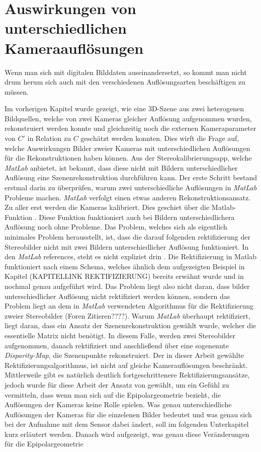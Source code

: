\chapter{Auswirkungen von unterschiedlichen Kameraauflösungen}

Wenn man sich mit digitalen Bilddaten auseinandersetzt, so kommt man nicht drum herum sich auch mit den  verschiedenen Auflösungsarten beschäftigen zu müssen.

Im vorherigen Kapitel wurde gezeigt, wie eine 3D-Szene aus zwei heterogenen Bildquellen, welche von zwei Kameras gleicher Auflösung aufgenommen wurden, rekonstruiert werden konnte und gleichzeitig noch die externen Kameraparameter von $C'$ in Relation zu $C$ geschätzt werden konnten. Dies wirft die Frage auf, welche Auswirkungen Bilder zweier Kameras mit unterschiedlichen Auflösungen für die Rekonstruktionen haben können. Aus der Stereokalibrierungsapp, welche \textit{MatLab} anbietet, ist bekannt, dass diese nicht mit Bildern unterschiedlicher Auflösung eine Szenenrekonstruktion durchführen kann. Der erste Schritt bestand erstmal darin zu überprüfen, warum zwei unterschiedliche Auflösungen in \textit{MatLab} Probleme machen. \textit{MatLab} verfolgt einen etwas anderen Rekonstruktionsansatz. Zu aller erst werden die Kameras kalibriert. Dies geschiet über die Matlab-Funktion \cite{MatlabCamParam}. Diese Funktion funktioniert auch bei Bildern unterschiedlichera Auflösung noch ohne Probleme. Das Problem, welches sich als eigentlich minimales Problem herausstellt, ist, dass die darauf folgenden rektifizierung der Stereobilder nicht mit zwei Bildern unterschiedlicher Auflösung funktioniert. In den \textit{MatLab} references, steht es nicht expliziet drin \cite{MatlabRec}. Die Rektifizierung in Matlab funktioniert nach einem Schema, welches ähnlich dem aufgezeigten Beispiel in Kapitel (KAPITELLINK REKTIFIZIERUNG) bereits erwähnt wurde und in \cite{Fusiello,FusielloSite} nochmal genau aufgeführt wird. Das Problem liegt also nicht daran, dass bilder unterschiedlicher Auflösung nicht rektifiziert werden können, sondern das Problem liegt an dem in \textit{MatLab} verwendeten Algorithmus für die Rektifizierung zweier Stereobilder (Foren Zitieren????). Warum \textit{MatLab} überhaupt rektifiziert, liegt daran, dass ein Ansatz der Szenenrekonstruktion gewählt wurde, welcher die essentielle Matrix nicht benötigt. In diesem Falle, werden zwei Stereobilder aufgenommen, danach rektifiziert und anschließend über eine sogenennte \textit{Disparity-Map}, die Szenenpunkte rekonstruiert\cite{MatlabDisp,MatlabStereoApp,Fusiello,Javier}. Der in dieser Arbeit gewählte Rektifizierungsalgorithmus, ist nicht auf gleiche Kamerauflösungen beschränkt. Mittlerweile gibt es natürlich deutlich fortgeschrittenere Rektifizierungsansätze, jedoch wurde für diese Arbeit der Ansatz von \cite{ZZ} gewählt, um ein Gefühl zu vermitteln, dass wenn man sich auf die Epipolargeometrie bezieht, die Auflösungen der Kameras keine Rolle spielen\cite{Elements}. Was genau unterschiedliche Auflösungen der Kameras für die einzelenen Bilder bedeutet und was genau sich bei der Aufnahme mit dem Sensor dabei ändert, soll im folgenden Unterkapitel kurz erläutert werden. Danach wird aufgezeigt, was genau diese Veränderungen für die Epipolargeometrie 